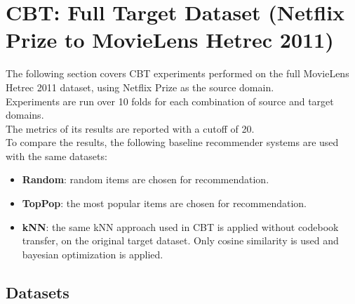 \clearpage



\section{CBT: Full Target Dataset (Netflix Prize to MovieLens Hetrec 2011)}

The following section covers CBT experiments performed on the full MovieLens Hetrec 2011 dataset, using Netflix Prize as the source domain.\\
Experiments are run over 10 folds for each combination of source and target domains.\\
The metrics of its results are reported with a cutoff of 20.\\
To compare the results, the following baseline recommender systems are used with the same datasets:
\begin{itemize}
\item \textbf{Random}: random items are chosen for recommendation.
\item \textbf{TopPop}: the most popular items are chosen for recommendation.
\item \textbf{kNN}: the same kNN approach used in CBT is applied without codebook transfer, on the original target dataset. Only cosine similarity is used and bayesian optimization is applied.
\end{itemize}


\subsection{Datasets}

